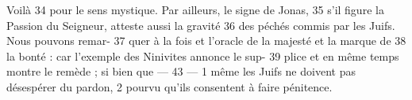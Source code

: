 Voilà	 
34	 	pour le sens mystique. Par ailleurs, le signe de Jonas,	 
35	 	s'il figure la Passion du Seigneur, atteste aussi la gravité	 
36	 	des péchés commis par les Juifs. Nous pouvons remar-	 
37	 	quer à la fois et l'oracle de la majesté et la marque de	 
38	 	la bonté : car l'exemple des Ninivites annonce le sup-	 
39	 	plice et en même temps montre le remède ; si bien que	 
 	--- 43 ---	 
1	 	même les Juifs ne doivent pas désespérer du pardon,	 
2	 	pourvu qu'ils consentent à faire pénitence.
